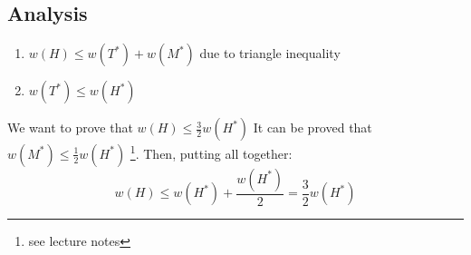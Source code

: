 \subsection{Analysis}
\begin{enumerate}
    \item $w(H) \leq w(T^*) + w(M^*)$ due to triangle inequality
    \item $w(T^*) \leq w(H^*)$
\end{enumerate}
We want to prove that $w(H) \leq \frac{3}{2}w(H^*)$\newline\newline
It can be proved that $w(M^*) \leq \frac{1}{2}w(H^*)$ \footnote{see lecture notes}. Then, putting all together:
\[w(H) \leq w(H^*) + \frac{w(H^*)}{2} = \frac{3}{2} w(H^*)\]

